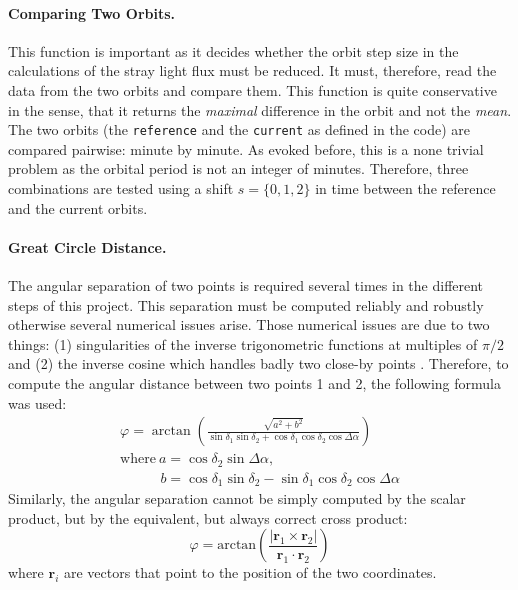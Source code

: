 \documentclass[a4paper,10pt]{article}
\begin{document}
\paragraph{Comparing Two Orbits.} This function is important as it decides whether the orbit step size in the calculations of the stray light flux must be reduced. It must, therefore, read the data from the two orbits and compare them. This function is quite conservative in the sense, that it returns the \emph{maximal} difference in the orbit and not the \emph{mean}. The two orbits (the \verb=reference= and the \verb=current= as defined in the code) are compared pairwise: minute by minute. As evoked before, this is a none trivial problem as the orbital period is not an integer of minutes. Therefore, three combinations are tested using a shift $s=\{0,1,2\}$ in time between the reference and the current orbits.

\paragraph{Great Circle Distance.} \label{app:great-circle-distance}
The angular separation of two points is required several times in the different steps of this project. This separation must be computed reliably and robustly otherwise several numerical issues arise. Those numerical issues are due to two things: (1) singularities of the inverse trigonometric functions at multiples of $\pi/2$ and (2) the inverse cosine which handles badly two close-by points \citep{Vincenty1975}. Therefore, to compute the angular distance between two points 1 and 2, the following formula was used:
\begin{equation}
\begin{aligned}
 &\varphi =\arctan\left(\frac{\sqrt{a^2+b^2}}{\sin\delta_1\sin\delta_2+\cos\delta_1\cos\delta_2\cos\Delta\alpha}\right) \\
 &\text{where}\ a = \cos\delta_2\sin\Delta\alpha, &\\
 & \ \ \ \ \qquad b = \cos\delta_1\sin\delta_2-\sin\delta_1\cos\delta_2\cos\Delta\alpha
 \end{aligned}
\end{equation}
Similarly, the angular separation cannot be simply computed by the scalar product, but by the equivalent, but always correct cross product:
\begin{equation}
 \varphi =\text{arctan}\left( \frac{\left| \pmb{r}_1\times \pmb{r}_2 \right|}{\pmb{r}_1\cdot \pmb{r}_2} \right)
\end{equation}
where $\pmb{r}_i$ are vectors that point to the position of the two coordinates.
\end{document}

